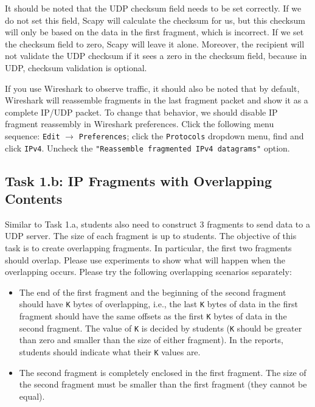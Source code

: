 It should be noted that the UDP checksum field needs to be set 
correctly. If we do not set this field, Scapy will calculate 
the checksum for us, but this checksum will only be based on the 
data in the first fragment, which is incorrect.
If we set the checksum field to  zero, Scapy will leave it alone.
Moreover, the recipient will not validate the UDP checksum 
if it sees a zero in the checksum field, 
because in UDP, checksum validation is optional.


If you use Wireshark to observe traffic, it should also be noted that by default, 
Wireshark will reassemble fragments in the last fragment packet and
show it as a complete IP/UDP packet. To change that behavior,
we should disable IP fragment reassembly in Wireshark preferences.
Click the following menu sequence: \texttt{Edit} $\rightarrow$ \texttt{Preferences}; 
click the \texttt{Protocols} dropdown menu, find and click \texttt{IPv4}.
Uncheck the \texttt{"Reassemble fragmented IPv4 datagrams"} option. 




\subsection{Task 1.b: IP Fragments with Overlapping Contents}

Similar to Task 1.a, students also need to construct 3 fragments to send data to a UDP server.
The size of each fragment is up to students.  The objective of this task is to create
overlapping fragments.  In particular, the first two fragments should overlap.  Please use
experiments to show what will happen when the overlapping occurs. Please
try the following overlapping scenarios separately:
 
 \begin{itemize} 
 \item The end of the first fragment and the beginning of the second
 fragment should have \texttt{K} bytes of overlapping, i.e., the last  
 \texttt{K} bytes of data in the first fragment should have the same
 offsets as the first \texttt{K} bytes of data in the second fragment. 
 The value of \texttt{K} is decided by students (\texttt{K} should be 
 greater than zero and smaller than the size of either fragment). In the reports, students
 should indicate what their \texttt{K} values are. 


 \item The second fragment is completely enclosed in the first fragment.
 The size of the second fragment must be smaller than the 
 first fragment (they cannot be equal).

 \end{itemize} 


